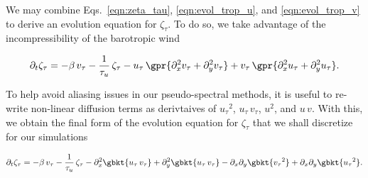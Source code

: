 We may combine Eqs.~\ref{eqn:zeta_tau}, \ref{eqn:evol_trop_u}, and \ref{eqn:evol_trop_v} to derive an evolution equation for $\zeta_{\tau}$. To do so, we take advantage of the incompressibility of the barotropic wind

\begin{equation}
	\partial_t \zeta_\tau = -\beta\,v_{\tau} - \frac{1}{\tau_u}\,\zeta_{\tau} - u_{\tau}\,\gpr{\partial_x^2 v_{\tau} + \partial_y^2 v_{\tau}} + v_{\tau}\,\gpr{\partial_x^2 u_{\tau} + \partial_y^2 u_{\tau}}.
\end{equation}

To help avoid aliasing issues in our pseudo-spectral methods, it is useful to re-write non-linear diffusion terms as derivtaives of ${u_{\tau}}^2$, $u_{\tau}\,v_{\tau}$, $u^2$, and $u\,v$. With this, we obtain the final form of the evolution equation for $\zeta_\tau$ that we shall discretize for our simulations

\begin{equation}
	\partial_t \zeta_\tau = -\beta\,v_{\tau} - \frac{1}{\tau_u}\,\zeta_{\tau} -\partial_x^2 \gbkt{u_{\tau}\,v_{\tau}} + \partial_y^2 \gbkt{u_{\tau}\,v_{\tau}} - \partial_x \partial_y \gbkt{{v_{\tau}}^2} + \partial_x \partial_y \gbkt{{u_{\tau}}^2}. \label{eqn:evol_zeta_tau}
\end{equation}
